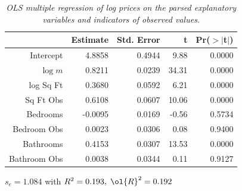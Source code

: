 \documentclass[12pt]{article}
\begin{document}
 \begin{table}
 \caption{ \label{tab:parsed} {\sl OLS multiple regression of log prices on the
 parsed explanatory variables and  indicators of observed values.}}

\begin{center}
\begin{tabular}{rrrrr}
  \hline
 & Estimate & Std. Error & t  & Pr($>$$|$t$|$) \\ 
  \hline
 Intercept & 4.8858 & 0.4944 & 9.88 & 0.0000 \\ 
  $\log m$ & 0.8211 & 0.0239 & 34.31 & 0.0000 \\ 
  log Sq Ft & 0.3680 & 0.0592 & 6.21 & 0.0000 \\ 
  Sq Ft Obs & 0.6108 & 0.0607 & 10.06 & 0.0000 \\ 
  Bedrooms & -0.0095 & 0.0169 & -0.56 & 0.5734 \\ 
  Bedroom Obs & 0.0023 & 0.0306 & 0.08 & 0.9400 \\ 
  Bathrooms & 0.4153 & 0.0307 & 13.53 & 0.0000 \\ 
  Bathroom Obs & 0.0038 & 0.0344 & 0.11 & 0.9127 \\ 
   \hline
\end{tabular}

   $s_e = 1.084$ with $R^2= 0.193,\;	\ol{R}^2 = 0.192$ 
 \end{center}
\end{table}
\end{document}
